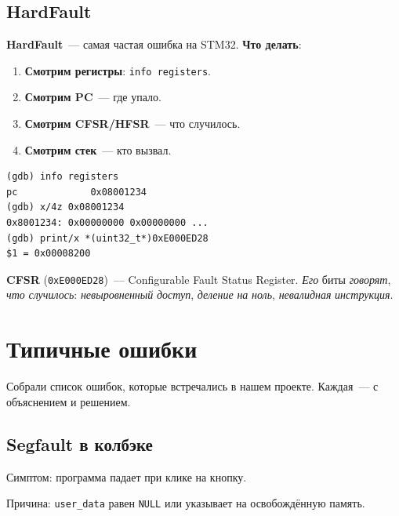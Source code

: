 \subsection{HardFault}

\textbf{HardFault}~--- самая частая ошибка на STM32.
\textbf{Что делать}:

\begin{enumerate}
    \item \textbf{Смотрим регистры}:
          \texttt{info registers}.
    \item \textbf{Смотрим PC}~--- где упало.
    \item \textbf{Смотрим CFSR/HFSR}~--- что случилось.
    \item \textbf{Смотрим стек}~--- кто вызвал.
\end{enumerate}

\begin{listing}[htbp]
\begin{verbatim}
(gdb) info registers
pc             0x08001234
(gdb) x/4z 0x08001234
0x8001234: 0x00000000 0x00000000 ...
(gdb) print/x *(uint32_t*)0xE000ED28
$1 = 0x00008200
\end{verbatim}
\caption{Диагностика HardFault}
\label{lst:debug-hardfault}
\end{listing}

\begin{keybox}
\textbf{CFSR} (\texttt{0xE000ED28})~--- Configurable
Fault Status Register. \emph{Его} биты \emph{говорят},
\emph{что} \emph{случилось}: \emph{невыровненный}
\emph{доступ}, \emph{деление} \emph{на} \emph{ноль},
\emph{невалидная} \emph{инструкция}.
\end{keybox}

\section{Типичные ошибки}
\label{sec:debug-common}

Собрали список ошибок, которые
встречались в нашем проекте. Каждая~---
с объяснением и решением.

\subsection{Segfault в колбэке}

Симптом: программа падает при клике
на кнопку.

Причина: \texttt{user\_data} равен \texttt{NULL}
или указывает на освобождённую память.


